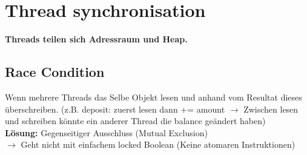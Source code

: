 
\section{Thread synchronisation}
\textbf{Threads teilen sich Adressraum und Heap.}
\subsection{Race Condition}
Wenn mehrere Threads das Selbe Objekt lesen und anhand vom Resultat dieses überschreiben. (z.B. deposit: zuerst lesen dann += amount $\rightarrow$ Zwischen lesen und schreiben könnte ein anderer Thread die balance geändert haben)\\
\textbf{Lösung:} Gegenseitiger Ausschluss (Mutual Exclusion)\\
$\rightarrow$ Geht nicht mit einfachem locked Boolean (Keine atomaren Instruktionen)
